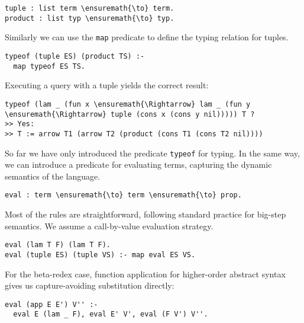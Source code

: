 \begin{verbatim}
tuple : list term \ensuremath{\to} term.
product : list typ \ensuremath{\to} typ.
\end{verbatim}

Similarly we can use the \texttt{map} predicate to define the typing
relation for tuples.

\begin{verbatim}
typeof (tuple ES) (product TS) :-
  map typeof ES TS.
\end{verbatim}

Executing a query with a tuple yields the correct result:

\begin{verbatim}
typeof (lam _ (fun x \ensuremath{\Rightarrow} lam _ (fun y \ensuremath{\Rightarrow} tuple (cons x (cons y nil))))) T ?
>> Yes:
>> T := arrow T1 (arrow T2 (product (cons T1 (cons T2 nil))))
\end{verbatim}

So far we have only introduced the predicate \texttt{typeof} for typing.
In the same way, we can introduce a predicate for evaluating terms,
capturing the dynamic semantics of the language.

\begin{verbatim}
eval : term \ensuremath{\to} term \ensuremath{\to} prop.
\end{verbatim}

Most of the rules are straightforward, following standard practice for
big-step semantics. We assume a call-by-value evaluation strategy.

\begin{verbatim}
eval (lam T F) (lam T F).
eval (tuple ES) (tuple VS) :- map eval ES VS.
\end{verbatim}

For the beta-redex case, function application for higher-order abstract
syntax gives us capture-avoiding substitution directly:

\begin{verbatim}
eval (app E E') V'' :-
  eval E (lam _ F), eval E' V', eval (F V') V''.
\end{verbatim}
